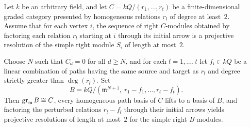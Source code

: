 \begin{lemma}
\label{lem:flat-mesh-perturbations}
Let $k$ be an arbitrary field, and let $C=kQ/(r_1,\ldots,r_t)$ be a finite-dimensional graded category presented by homogeneous relations $r_l$ of degree at least~$2$. Assume that for each vertex $i$, the sequence of right $C$-modules obtained by factoring each relation $r_l$ starting at $i$ through its initial arrow is a projective resolution of the simple right module $S_i$ of length at most~$2$.

Choose $N$ such that $C_d=0$ for all $d\geq N$, and for each $l=1,\ldots,t$ let $f_l\in kQ$ be a linear combination of paths having the same source and target as $r_l$ and degree strictly greater than $\deg(r_l)$. Set
\[
  B=kQ/(\mathfrak m^{N+1},\ r_1-f_1,\ldots,r_t-f_t).
\]
Then $\operatorname{gr}_{\mathfrak m}B\cong C$, every homogeneous path basis of $C$ lifts to a basis of $B$, and factoring the perturbed relations $r_l-f_l$ through their initial arrows yields projective resolutions of length at most~$2$ for the simple right $B$-modules.
\end{lemma}
